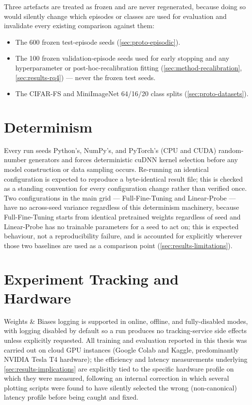 \documentclass{iutbscthesis}
\begin{document}
\begin{appendices}
Three artefacts are treated as frozen and are never regenerated, because doing so would silently change which episodes or classes are used for evaluation and invalidate every existing comparison against them:

\begin{itemize}
    \item The 600 frozen test-episode seeds (\autoref{sec:proto-episodic}).
    \item The 100 frozen validation-episode seeds used for early stopping and any hyperparameter or post-hoc-recalibration fitting (\autoref{sec:method-recalibration}, \autoref{sec:results-rq4}) — never the frozen test seeds.
    \item The CIFAR-FS and MiniImageNet 64/16/20 class splits (\autoref{sec:proto-datasets}).
\end{itemize}

\section{Determinism}

Every run seeds Python's, NumPy's, and PyTorch's (CPU and CUDA) random-number generators and forces deterministic cuDNN kernel selection before any model construction or data sampling occurs. Re-running an identical configuration is expected to reproduce a byte-identical result file; this is checked as a standing convention for every configuration change rather than verified once. Two configurations in the main grid — Full-Fine-Tuning and Linear-Probe — have no across-seed variance regardless of this determinism machinery, because Full-Fine-Tuning starts from identical pretrained weights regardless of seed and Linear-Probe has no trainable parameters for a seed to act on; this is expected behaviour, not a reproducibility failure, and is accounted for explicitly wherever those two baselines are used as a comparison point (\autoref{sec:results-limitations}).

\section{Experiment Tracking and Hardware}

Weights \& Biases logging is supported in online, offline, and fully-disabled modes, with logging disabled by default so a run produces no tracking-service side effects unless explicitly requested. All training and evaluation reported in this thesis was carried out on cloud GPU instances (Google Colab and Kaggle, predominantly NVIDIA Tesla T4 hardware); the efficiency and latency measurements underlying \autoref{sec:results-implications} are explicitly tied to the specific hardware profile on which they were measured, following an internal correction in which several plotting scripts were found to have silently selected the wrong (non-canonical) latency profile before being caught and fixed.

\end{appendices}
\end{document}
